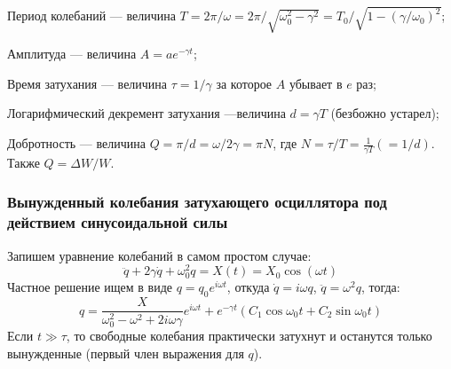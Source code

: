 \begin{minipage}[t]{0.05\textwidth}
\end{minipage}
\hfill
\begin{minipage}[t]{0.95\textwidth}
    \begin{description*}
    \item[Период колебаний] --- величина $T = 2 \pi / \omega = 2\pi / \sqrt{\omega_0^2 - \gamma^2} = T_0 / \sqrt{1 - (\gamma/\omega_0)^2}$;
    \item[Амплитуда]  --- величина $A = a e^{- \gamma t} $;
    \item[Время затухания] --- величина $\tau = 1/\gamma$ за которое $A$ убывает в $e$ раз;
    \item[Логарифмический декремент затухания] ---величина  $d = \gamma T$ (безбожно устарел);
    \item[Добротность] --- величина $Q = \pi / d = \omega / 2 \gamma = \pi N$, где $N = \tau/T = \frac{1}{\gamma T} (= 1/d)$. 
    Также $Q = \Delta W / W$. 
\end{description*}
\end{minipage}

\subsubsection*{Вынужденный колебания затухающего осциллятора под действием синусоидальной силы}

Запишем уравнение колебаний в самом простом случае:
\begin{equation}
	\ddot{q} + 2 \gamma \dot{q} + \omega_0^2 q = X(t) = X_0 \cos (\omega t)
\end{equation}
Частное решение ищем в виде $q = q_0 e^{i \omega t}$, откуда $\dot{q} = i \omega q$, $\ddot{q} = \omega^{2} q $, тогда:
\begin{equation}
	q = \frac{X}{\omega_0^2 - \omega^2 + 2 i \omega \gamma} e^{i \omega t} + e^{-\gamma t}(C_1 \cos \omega_0 t + C_2 \sin \omega_0 t)
\end{equation}
Если $t \gg \tau$, то свободные колебания практически затухнут и останутся только вынужденные (первый член выражения для $q$).

